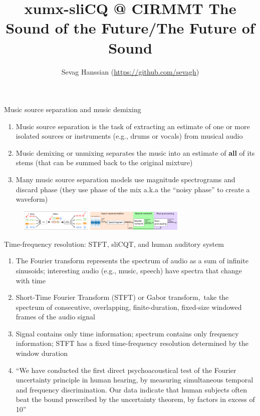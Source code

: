 \documentclass[final]{beamer}
\title{xumx-sliCQ @ CIRMMT The Sound of the Future/The Future of Sound}
\author{Sevag Hanssian (\url{https://github.com/sevagh})}
\institute{McGill University}
\begin{document}
  \begin{frame}{} 
	\begin{block}{Music source separation and music demixing}
		\begin{enumerate}
			\item
				Music source separation is the task of extracting an estimate of one or more isolated sources or instruments (e.g., drums or vocals) from musical audio
			\item
				Music demixing or unmixing separates the music into an estimate of \textbf{all} of its stems (that can be summed back to the original mixture)
		  \item
			  Many music source separation models use magnitude spectrograms and discard phase (they use phase of the mix a.k.a the ``noisy phase'' to create a waveform)
		\end{enumerate}
	\end{block}
	  \begin{figure}
		  \centering
		  \includegraphics[width=0.3\textwidth]{./images-mss/mixdemix.png}
		  \hspace{1em}
		  \includegraphics[width=0.41\textwidth]{./images-blockdiagrams/generic_mdx.png}
	  \end{figure}
	\begin{block}{Time-frequency resolution: STFT, sliCQT, and human auditory system}
	  \begin{enumerate}
		  \item
			  The Fourier transform represents the spectrum of audio as a sum of infinite sinusoids; interesting audio (e.g., music, speech) have spectra that change with time
		  \item
			  Short-Time Fourier Transform (STFT) or Gabor transform,\footnotemark\ take the spectrum of consecutive, overlapping, finite-duration, fixed-size windowed frames of the audio signal
		  \item
			  Signal contains only time information; spectrum contains only frequency information; STFT has a fixed time-frequency resolution determined by the window duration
		  \item
			``We have conducted the first direct psychoacoustical test of the Fourier uncertainty principle in human hearing, by measuring simultaneous temporal and frequency discrimination. Our data indicate that human subjects often beat the bound prescribed by the uncertainty theorem, by factors in excess of 10''\footnotemark

\end{enumerate}
\end{block}
\end{frame}
\end{document}
